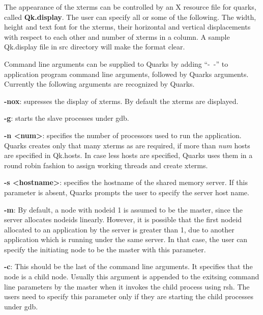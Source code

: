 The appearance of the xterms can be controlled by an X
resource file for quarks, called {\bf Qk.display}. The user can
specify all or some of the following. The width, height and text font
for the xterms, their horizontal and vertical displacements with
respect to each other and number of xterms in a column. A sample
Qk.display file in src directory will make the format clear.


Command line arguments can be supplied to Quarks by adding ``-~-'' to 
application program command line arguments, followed by
Quarks arguments. Currently the following arguments are recognized by
Quarks.

\hspace*{-10 mm} {\bf -nox}: supresses the display of xterms.
By default the xterms are displayed. 

\hspace*{-10 mm} {\bf -g}: starts the slave processes under gdb. 

\hspace*{-10 mm} {\bf -n <num>}: specifies the number of processors 
used to run the
application. Quarks creates only that many xterms as are required, if
more than {\em num} hosts are specified in Qk.hosts. In case less
hosts are specified, Quarks uses them in a round robin fashion to
assign working threads and create xterms. 

\hspace*{-10 mm} {\bf -s <hostname>}: specifies the hostname of the
shared memory server. If this parameter is absent, Quarks prompts the
user to specify the server host name. 

\hspace*{-10 mm} {\bf -m}: By default, a node with nodeid 1 is assumed
to be the master, since the server allocates nodeids linearly.
However, it is possible that the first nodeid allocated to an
application by the server is greater than 1, due to another
application which is running under the same server. In that case, the
user can specify the initiating node to be the master with this
parameter.

\hspace*{-10 mm} {\bf -c}: This should be the last of the command line
arguments. It specifies that the node is a child node. Usually this
argument is appended to the exitsing command line parameters by the
master when it invokes the child process using rsh. The users need to
specify this parameter only if they are starting the child processes
under gdb. 

